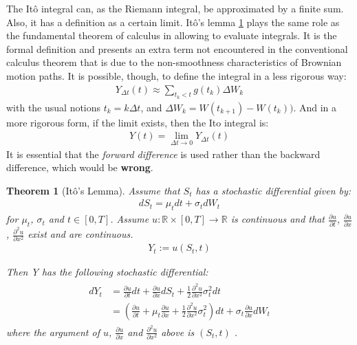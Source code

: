 \documentclass[12pt,twoside]{reedthesis}
\newtheorem{theorem}{Theorem}[section]
\theoremstyle{definition}
\theoremstyle{definition}
\theoremstyle{remark}
\begin{document}
  The Itô integral can, as the Riemann integral, be approximated by a
  finite sum. Also, it has a definition as a certain limit. Itô's lemma
  \ref{itolemma} plays the same role as the fundamental theorem of
  calculus in allowing to evaluate integrals. It is the formal definition
  and presents an extra term not encountered in the conventional calculus
  theorem that is due to the non-smoothness characteristics of Brownian
  motion paths. It is possible, though, to define the integral in a less
  rigorous way:
  \begin{align}
  Y_{\Delta t}(t) \approx \sum_{t_k < t}{g(t_k)\Delta W_k}
  \end{align}
  \noindent
  with the usual notions \(t_k = k\Delta t\), and
  \(\Delta W_k = W(t_{k+1})-W(t_k))\). And in a more rigorous form, if the
  limit exists, then the Ito integral is:
  \begin{align}
  Y(t)  = \lim\limits_{\Delta t \to 0} Y_{\Delta t}(t)
  \end{align}
  It is essential that the \emph{forward difference} is used rather than
  the backward difference, which would be \textbf{wrong}.
  \begin{theorem}[Itô's Lemma] \label{itolemma}
  Assume that $S_t$ has a stochastic differential given by:
  \begin{align}
  dS_t = \mu_t dt + \sigma_t dW_t 
  \end{align}
  \noindent
  for $\mu_t$, $\sigma_t$ and $t \in [0,T]$. Assume $u: \mathbb{R} \times [0, T] \rightarrow \mathbb{R}$ is continuous and that $\frac{\partial u}{\partial t}$, $\frac{\partial u}{\partial x}$, $\frac{\partial^2 u}{\partial x^2}$ exist and are continuous.
  \begin{align*}
  Y_t := u(S_t, t)
  \end{align*}
  
  \noindent
  Then Y has the following stochastic differential:
  \begin{align} 
  \label{eq:ito}
  \begin{split}
      dY_t &= \frac{\partial u}{\partial t}dt + \frac{\partial u}{\partial x} dS_t + \frac{1}{2}\frac{\partial^2 u}{\partial x^2}\sigma_t^2 dt  \\[10pt] 
      &= \left( \frac{\partial u}{\partial t} + \mu_t \frac{\partial u}{\partial x} + \frac{1}{2}\frac{\partial^2 u}{\partial x^2}\sigma_t^2 \right) dt + \sigma_t \frac{\partial u}{\partial x} dW_t
  \end{split}
  \end{align}
  \noindent 
  where the argument of $u$, $\frac{\partial u}{\partial x}$ and $\frac{\partial^2 u}{\partial x^2}$ above is $\left( S_t, t \right)$ .
  \end{theorem}
\end{document}
